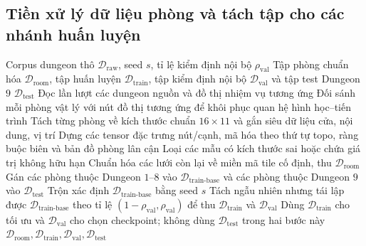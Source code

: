 \documentclass[oneside,a4paper,12pt]{extreport}
\begin{document}
\subsection{Tiền xử lý dữ liệu phòng và tách tập cho các nhánh huấn luyện}
\begin{algorithm}[H]
\caption{Tiền xử lý dữ liệu phòng và tách tập cho các nhánh huấn luyện}
\label{alg:preprocess_data_split}
\begin{algorithmic}[1]
\Require Corpus dungeon thô $\mathcal{D}_{\text{raw}}$, seed $s$, tỉ lệ kiểm định nội bộ $\rho_{\mathrm{val}}$
\Ensure Tập phòng chuẩn hóa $\mathcal{D}_{\text{room}}$, tập huấn luyện $\mathcal{D}_{\text{train}}$, tập kiểm định nội bộ $\mathcal{D}_{\text{val}}$ và tập test Dungeon $9$ $\mathcal{D}_{\text{test}}$
\State Đọc lần lượt các dungeon nguồn và đồ thị nhiệm vụ tương ứng
\State Đối sánh mỗi phòng vật lý với nút đồ thị tương ứng để khôi phục quan hệ hình học--tiến trình
\State Tách từng phòng về kích thước chuẩn $16\times 11$ và gắn siêu dữ liệu cửa, nội dung, vị trí
  \State Dựng các tensor đặc trưng nút/cạnh, mã hóa theo thứ tự topo, ràng buộc biên và bản đồ phòng lân cận
\State Loại các mẫu có kích thước sai hoặc chứa giá trị không hữu hạn
\State Chuẩn hóa các lưới còn lại về miền mã tile cố định, thu $\mathcal{D}_{\text{room}}$
\State Gán các phòng thuộc Dungeon $1$--$8$ vào $\mathcal{D}_{\text{train-base}}$ và các phòng thuộc Dungeon $9$ vào $\mathcal{D}_{\text{test}}$
\State Trộn xác định $\mathcal{D}_{\text{train-base}}$ bằng seed $s$
\State Tách ngẫu nhiên nhưng tái lập được $\mathcal{D}_{\text{train-base}}$ theo tỉ lệ $(1-\rho_{\mathrm{val}},\rho_{\mathrm{val}})$ để thu $\mathcal{D}_{\text{train}}$ và $\mathcal{D}_{\text{val}}$
\State Dùng $\mathcal{D}_{\text{train}}$ cho tối ưu và $\mathcal{D}_{\text{val}}$ cho chọn checkpoint; không dùng $\mathcal{D}_{\text{test}}$ trong hai bước này
\State \Return $\mathcal{D}_{\text{room}},\mathcal{D}_{\text{train}},\mathcal{D}_{\text{val}},\mathcal{D}_{\text{test}}$
\end{algorithmic}
\end{algorithm}
\end{document}
